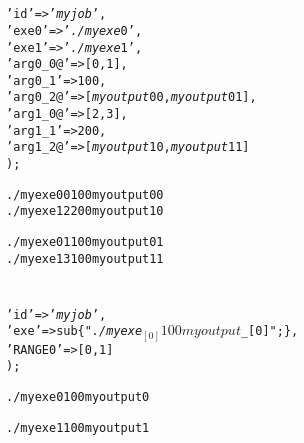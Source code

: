 \documentclass[a4paper,10pt]{report}
\begin{document}
\section{}

\begin{boxnote}
\begin{alltt}
%myjob = (
    'id' => '\textit{myjob}',
    'exe0' => '\textit{./myexe}0',
    'exe1' => '\textit{./myexe}1',
    'arg0_0@' => [0,1],
    'arg0_1' => 100,
    'arg0_2@' => [\textit{myoutput}00,\textit{myoutput}01],
    'arg1_0@' => [2,3],
    'arg1_1' => 200,
    'arg1_2@' => [\textit{myoutput}10,\textit{myoutput}11]
);
\end{alltt}
\end{boxnote}

\begin{boxnote}
\begin{alltt}
./myexe0 0 100 myoutput00
./myexe1 2 200 myoutput10
\end{alltt}
\end{boxnote}

\begin{boxnote}
\begin{alltt}
./myexe0 1 100 myoutput01
./myexe1 3 100 myoutput11
\end{alltt}
\end{boxnote}


\section{}

\begin{boxnote}
\begin{alltt}
%myjob = (
  'id' => '\textit{myjob}',
  'exe' => sub \{ "\textit{./myexe} $_[0] 100 \textit{myoutput} $_[0]"; \},
  'RANGE0' => [0,1]
);
\end{alltt}
\end{boxnote}

\begin{boxnote}
\begin{alltt}
./myexe 0 100 myoutput0
\end{alltt}
\end{boxnote}

\begin{boxnote}
\begin{alltt}
./myexe 1 100 myoutput1
\end{alltt}
\end{boxnote}

\section{}
\end{document}
